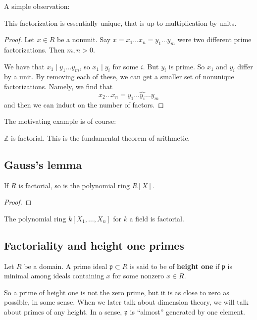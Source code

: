 A simple observation:
\begin{proposition} 
This factorization is essentially unique, that is up to multiplication by units.
\end{proposition} 
\begin{proof} Let $x \in R$ be a nonunit. 
Say $x = x_1 \dots x_n = y_1 \dots y_m$ were two different prime
factorizations. Then $m,n>0$. 

We have that $x_1 \mid y_1 \dots y_m$, so $x_1 \mid y_i$ for some $i$. But
$y_i$ is prime. So $x_1$ and $y_i$ differ by a unit. By removing each of these,
we can get  a smaller set of nonunique factorizations. 
Namely, we find that
\[ x_2 \dots x_n = y_1 \dots \hat{y_i} \dots y_m  \]
and then we can induct on the number of factors.
\end{proof} 

The motivating example is of course:
\begin{example} 
$\mathbb{Z}$ is factorial. This is the fundamental theorem of arithmetic. 
\end{example} 

\subsection{Gauss's lemma}

\begin{theorem} 
If $R$ is factorial, so is the polynomial ring $R[X]$.
\end{theorem} 
\begin{proof} 
\end{proof} 


\begin{corollary} 
The polynomial ring $k[X_1, \dots, X_n]$ for $k$ a field is factorial.
\end{corollary} 

\subsection{Factoriality and height one primes}

\begin{definition} 
Let $R$ be a domain. A prime ideal $\mathfrak{p} \subset R$ is said to be of
\textbf{height one} if $\mathfrak{p}$ is minimal among ideals
containing $x$ for some nonzero $x \in R$. 
\end{definition} 
So a prime of height one is not the zero prime, but it is as close to zero as
possible, in some sense. When we later talk about dimension theory, we will
talk about primes of any height. In a sense, $\mathfrak{p}$ is ``almost''
generated by one element.

